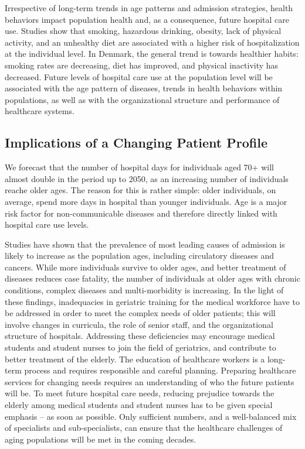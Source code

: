 Irrespective of long-term trends in age patterns and admission strategies, health 
behaviors impact population health and, as a consequence, future hospital care 
use. Studies show that smoking, hazardous drinking, obesity, lack of physical 
activity, and an unhealthy diet are associated with a higher risk of hospitalization 
at the individual level.\citep{hanlon2007analysis}  In Denmark, the general trend 
is towards healthier habits: smoking rates are decreasing, diet has improved, 
and physical inactivity has decreased.\citep{groth2014disparities} Future levels 
of hospital care use at the population level will be associated with the age pattern 
of diseases, trends in health behaviors within populations, as well as with the 
organizational structure and performance of healthcare systems. \\

\subsection{Implications of a Changing Patient Profile}

We forecast that the number of hospital days for individuals aged 70+ will almost 
double in the period up to 2050, as an increasing number of individuals reache 
older ages. The reason for this is rather simple: older individuals, on average, 
spend more days in hospital than younger individuals. Age is a major risk factor 
for non-communicable diseases and therefore directly linked with hospital care use 
levels.

Studies have shown that the prevalence of most leading causes of admission is 
likely to increase as the population ages, including circulatory diseases and 
cancers.\citep{christensen2009ageing} While more individuals survive to older 
ages, and better treatment of diseases reduces case fatality, the number of 
individuals at older ages with chronic conditions, complex diseases and multi-morbidity 
is increasing.\citep{christensen2009ageing} In the light of these findings, 
inadequacies in geriatric training for the medical workforce have to be addressed 
in order to meet the complex needs of older patients; this will involve changes 
in curricula, the role of senior staff, and the organizational structure of 
hospitals.\citep{samra2015medical} Addressing these deficiencies may encourage 
medical students and student nurses to join the field of geriatrics, and contribute 
to better treatment of the elderly.\citep{fisher2018pejorative} The education 
of healthcare workers is a long-term process and requires responsible and careful 
planning. Preparing healthcare services for changing needs requires an understanding 
of who the future patients will be. To meet future hospital care needs, reducing 
prejudice towards the elderly among medical students and student nurses has to be 
given special emphasis -- as soon as possible.\citep{fisher2018pejorative} Only 
sufficient numbers, and a well-balanced mix of specialists and sub-specialists, 
can ensure that the healthcare challenges of aging populations will be met in 
the coming decades.\citep{dall2013aging} \\

